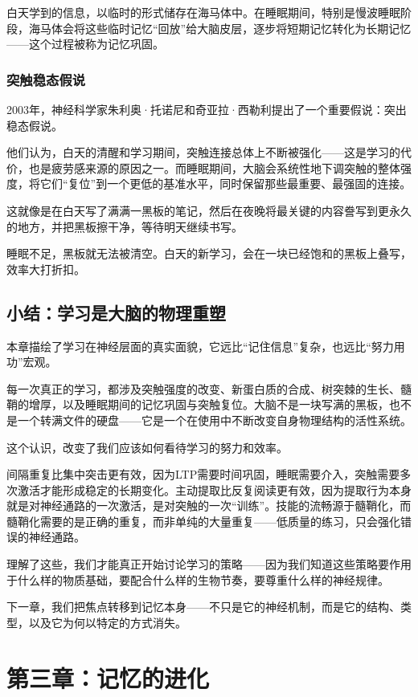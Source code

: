 \documentclass[11pt]{article}
\begin{document}
白天学到的信息，以临时的形式储存在海马体中。在睡眠期间，特别是慢波睡眠阶段，海马体会将这些临时记忆“回放”给大脑皮层，逐步将短期记忆转化为长期记忆——这个过程被称为记忆巩固。
\subsubsection{突触稳态假说}
\label{sec:org200eb45}

2003年，神经科学家朱利奥·托诺尼和奇亚拉·西勒利提出了一个重要假说：突出稳态假说。

他们认为，白天的清醒和学习期间，突触连接总体上不断被强化——这是学习的代价，也是疲劳感来源的原因之一。而睡眠期间，大脑会系统性地下调突触的整体强度，将它们“复位”到一个更低的基准水平，同时保留那些最重要、最强固的连接。

这就像是在白天写了满满一黑板的笔记，然后在夜晚将最关键的内容誊写到更永久的地方，并把黑板擦干净，等待明天继续书写。

睡眠不足，黑板就无法被清空。白天的新学习，会在一块已经饱和的黑板上叠写，效率大打折扣。
\subsection{小结：学习是大脑的物理重塑}
\label{sec:orga145f10}

本章描绘了学习在神经层面的真实面貌，它远比“记住信息”复杂，也远比“努力用功”宏观。

每一次真正的学习，都涉及突触强度的改变、新蛋白质的合成、树突棘的生长、髓鞘的增厚，以及睡眠期间的记忆巩固与突触复位。大脑不是一块写满的黑板，也不是一个转满文件的硬盘——它是一个在使用中不断改变自身物理结构的活性系统。

这个认识，改变了我们应该如何看待学习的努力和效率。

间隔重复比集中突击更有效，因为LTP需要时间巩固，睡眠需要介入，突触需要多次激活才能形成稳定的长期变化。主动提取比反复阅读更有效，因为提取行为本身就是对神经通路的一次激活，是对突触的一次“训练”。技能的流畅源于髓鞘化，而髓鞘化需要的是正确的重复，而非单纯的大量重复——低质量的练习，只会强化错误的神经通路。

理解了这些，我们才能真正开始讨论学习的策略——因为我们知道这些策略要作用于什么样的物质基础，要配合什么样的生物节奏，要尊重什么样的神经规律。

下一章，我们把焦点转移到记忆本身——不只是它的神经机制，而是它的结构、类型，以及它为何以特定的方式消失。
\section{第三章：记忆的进化}
\label{sec:orgfc2e9ee}
\end{document}
